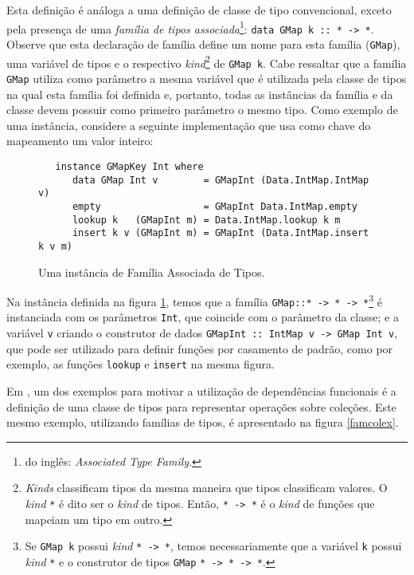 Esta defini\c{c}\~ao \'e an\'aloga a uma defini\c{c}\~ao de classe de tipo convencional, exceto pela presen\c{c}a de
uma \emph{fam\'ilia de tipos associada}\footnote{do ingl\^es: \emph{Associated Type Family}.}: 
\texttt{data GMap k :: * -> *}. Observe que esta declara\c{c}\~ao de fam\'ilia define um nome para esta fam\'ilia 
(\texttt{GMap}), uma vari\'avel de tipos e o respectivo \emph{kind}\footnote{\emph{Kinds} classificam tipos da mesma
maneira que tipos classificam valores. O \emph{kind} \texttt{*} \'e dito ser o \emph{kind} de tipos. Ent\~ao, 
\texttt{* -> *} \'e o \emph{kind} de fun\c{c}\~oes que mapeiam um tipo em outro.} de \texttt{GMap k}.
Cabe ressaltar que a fam\'ilia \texttt{GMap} utiliza como par\^ametro a mesma vari\'avel que \'e utilizada pela classe
de tipos na qual esta fam\'ilia foi definida e, portanto, todas as inst\^ancias da fam\'ilia e da classe devem possuir
como primeiro par\^ametro o mesmo tipo. Como exemplo de uma inst\^ancia, considere a seguinte implementa\c{c}\~ao que
usa como chave do mapeamento um valor inteiro:

\begin{figure}[h]
   \begin{verbatim}
   instance GMapKey Int where
      data GMap Int v        = GMapInt (Data.IntMap.IntMap v)
      empty                  = GMapInt Data.IntMap.empty
      lookup k   (GMapInt m) = Data.IntMap.lookup k m
      insert k v (GMapInt m) = GMapInt (Data.IntMap.insert k v m)   
   \end{verbatim}
   \centering
   \caption{Uma inst\^ancia de Fam\'ilia Associada de Tipos.}
   \label{fammapexint}
\end{figure}

Na inst\^ancia definida na figura \ref{fammapexint}, temos que a fam\'ilia 
\texttt{GMap::* -> * -> *}\footnote{Se \texttt{GMap k} possui \emph{kind} \texttt{* -> *}, temos necessariamente que
a vari\'avel \texttt{k} possui \emph{kind} \texttt{*} e o construtor de tipos \texttt{GMap} \texttt{* -> * -> *}.}
\'e instanciada com os par\^ametros \texttt{Int}, que coincide com o par\^ametro da classe; e a vari\'avel \texttt{v} 
criando o construtor de dados \texttt{GMapInt :: IntMap v -> GMap Int v}, que pode ser utilizado para definir 
fun\c{c}\~oes por casamento de padr\~ao, como por exemplo, as fun\c{c}\~oes \texttt{lookup} e \texttt{insert} na
mesma figura.

Em \cite{Jones00}, um dos exemplos para motivar a utiliza\c{c}\~ao de depend\^encias funcionais \'e a defini\c{c}\~ao de
uma classe de tipos para representar opera\c{c}\~oes sobre cole\c{c}\~oes. Este mesmo exemplo, utilizando
fam\'ilias de tipos, \'e apresentado na figura \ref{famcolex}.

